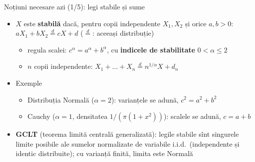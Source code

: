 \begin{frame}{Noțiuni necesare azi (1/5): legi stabile și sume}
\itemsize{\small}
\begin{itemize}
    \item $X$ este \textbf{stabilă} dacă, pentru copii independente $X_1, X_2$ și orice $a, b > 0$: $aX_1 + bX_2 \overset{d}{=} cX + d$ ($\overset{d}{=}$: aceeași distribuție)
    \begin{itemize}
        \item regula scalei: $c^\alpha = a^\alpha + b^\alpha$, cu \textbf{indicele de stabilitate} $0 < \alpha \le 2$
        \item $n$ copii independente: $X_1 + \dots + X_n \overset{d}{=} n^{1/\alpha}X + d_n$
    \end{itemize}
    \item Exemple
    \begin{itemize}
        \item Distribuția Normală ($\alpha = 2$): varianțele se adună, $c^2 = a^2 + b^2$
        \item Cauchy ($\alpha = 1$, densitatea $1/(\pi(1 + x^2))$): scalele se adună, $c = a + b$
    \end{itemize}
    \item \textbf{GCLT} (teorema limită centrală generalizată): legile stabile sînt singurele limite posibile ale sumelor normalizate de variabile i.i.d.\ (independente și identic distribuite); cu varianță finită, limita este Normală
\end{itemize}
\end{frame}

